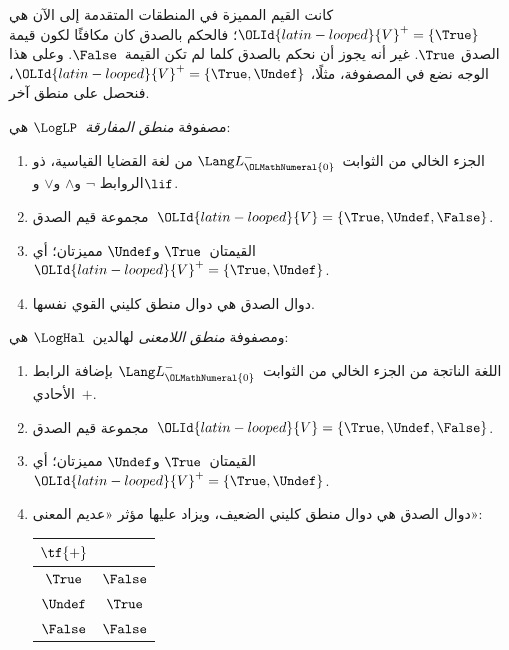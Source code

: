 \documentclass[../../../include/open-logic-section]{subfiles}
\begin{document}


كانت القيم المميزة في المنطقات المتقدمة إلى الآن هي
$\OLId{latin-looped}{V}^+ = \{\True\}$؛ فالحكم بالصدق كان مكافئًا لكون قيمة الصدق
$\True$. غير أنه يجوز أن نحكم بالصدق كلما لم تكن القيمة~$\False$.
وعلى هذا الوجه نضع في المصفوفة، مثلًا،
$\OLId{latin-looped}{V}^+ = \{\True, \Undef\}$، فنحصل على منطق آخر.

\begin{defn}
مصفوفة \emph{منطق المفارقة}~$\LogLP$ هي:
\begin{enumerate}
  \item الجزء الخالي من الثوابت~$\Lang L_\OLMathNumeral{0}^{-}$ من لغة القضايا القياسية، ذو الروابط
  $\lnot$ و$\land$ و$\lor$ و$\lif$.
  \item مجموعة قيم الصدق~$\OLId{latin-looped}{V} = \{\True, \Undef, \False\}$.
  \item القيمتان~$\True$ و$\Undef$ مميزتان؛ أي
  $\OLId{latin-looped}{V}^+ = \{\True, \Undef\}$.
  \item دوال الصدق هي دوال منطق كليني القوي نفسها.
\end{enumerate}
\end{defn}

\begin{defn}
ومصفوفة \emph{منطق اللامعنى} لهالدين~$\LogHal$ هي:
\begin{enumerate}
  \item اللغة الناتجة من الجزء الخالي من الثوابت~$\Lang L_\OLMathNumeral{0}^{-}$
  بإضافة الرابط الأحادي~$+$.
  \item مجموعة قيم الصدق~$\OLId{latin-looped}{V} = \{\True, \Undef, \False\}$.
  \item القيمتان~$\True$ و$\Undef$ مميزتان؛ أي
  $\OLId{latin-looped}{V}^+ = \{\True, \Undef\}$.
  \item دوال الصدق هي دوال منطق كليني الضعيف، ويزاد عليها مؤثر
  «عديم المعنى»:
  \begin{center}
    \begin{tabular}{c|c}
    $\tf{+}$ & \\
    \hline
    $\True$ & $\False$ \\
    $\Undef$ & $\True$ \\
    $\False$ & $\False$
    \end{tabular}
  \end{center}
\end{enumerate}
\end{defn}
\end{document}
